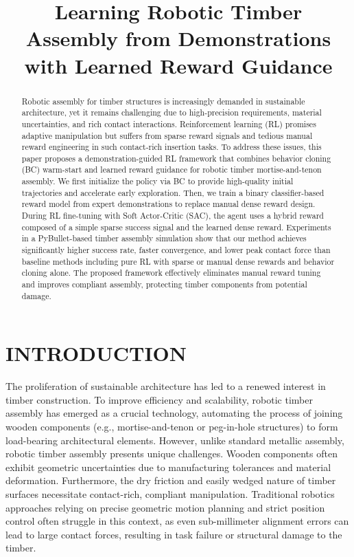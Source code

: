 \documentclass[conference]{IEEEtran}
\begin{document}
\title{Learning Robotic Timber Assembly from Demonstrations with Learned Reward Guidance}

\author{
}

\maketitle

\begin{abstract}
Robotic assembly for timber structures is increasingly demanded in sustainable architecture, yet it remains challenging due to high-precision requirements, material uncertainties, and rich contact interactions. Reinforcement learning (RL) promises adaptive manipulation but suffers from sparse reward signals and tedious manual reward engineering in such contact-rich insertion tasks. To address these issues, this paper proposes a demonstration-guided RL framework that combines behavior cloning (BC) warm-start and learned reward guidance for robotic timber mortise-and-tenon assembly. We first initialize the policy via BC to provide high-quality initial trajectories and accelerate early exploration. Then, we train a binary classifier-based reward model from expert demonstrations to replace manual dense reward design. During RL fine-tuning with Soft Actor-Critic (SAC), the agent uses a hybrid reward composed of a simple sparse success signal and the learned dense reward. Experiments in a PyBullet-based timber assembly simulation show that our method achieves significantly higher success rate, faster convergence, and lower peak contact force than baseline methods including pure RL with sparse or manual dense rewards and behavior cloning alone. The proposed framework effectively eliminates manual reward tuning and improves compliant assembly, protecting timber components from potential damage.
\end{abstract}

\section{INTRODUCTION}
The proliferation of sustainable architecture has led to a renewed interest in timber construction. To improve efficiency and scalability, robotic timber assembly has emerged as a crucial technology, automating the process of joining wooden components (e.g., mortise-and-tenon or peg-in-hole structures) to form load-bearing architectural elements. However, unlike standard metallic assembly, robotic timber assembly presents unique challenges. Wooden components often exhibit geometric uncertainties due to manufacturing tolerances and material deformation. Furthermore, the dry friction and easily wedged nature of timber surfaces necessitate contact-rich, compliant manipulation. Traditional robotics approaches relying on precise geometric motion planning and strict position control often struggle in this context, as even sub-millimeter alignment errors can lead to large contact forces, resulting in task failure or structural damage to the timber.
\end{document}
